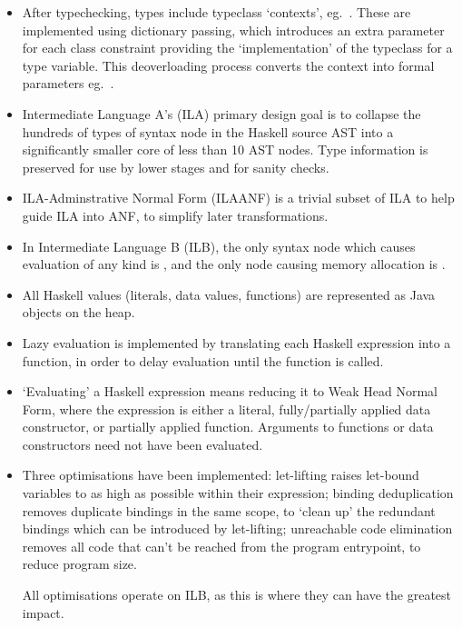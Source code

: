 \documentclass[dissertation.tex]{subfiles}
\begin{document}
{\begin{itemize}
{        Typeclasses provide a way to implement strongly-typed ad-hoc overloading, allowing for the types of overloaded expressions to be known at compile time.
    }
    \item
    {
        After typechecking, types include typeclass `contexts', eg.\ . These are implemented using dictionary passing, which introduces an extra parameter for each class constraint providing the `implementation' of the typeclass for a type variable. This deoverloading process converts the context into formal parameters eg.\ .
    }
    \item
    {
        Intermediate Language A's (ILA) primary design goal is to collapse the hundreds of types of syntax node in the Haskell source AST into a significantly smaller core of less than 10 AST nodes. Type information is preserved for use by lower stages and for sanity checks.
    }
    \item
    {
        ILA-Adminstrative Normal Form (ILAANF) is a trivial subset of ILA to help guide ILA into ANF, to simplify later transformations.
    }
    \item
    {
        In Intermediate Language B (ILB), the only syntax node which causes evaluation of any kind is , and the only node causing memory allocation is .
    }
    \item All Haskell values (literals, data values, functions) are represented as Java objects on the heap.
    \item
    {
        Lazy evaluation is implemented by translating each Haskell expression into a function, in order to delay evaluation until the function is called.
    }
    \item
    {
        `Evaluating' a Haskell expression means reducing it to Weak Head Normal Form, where the expression is either a literal, fully/partially applied data constructor, or partially applied function. Arguments to functions or data constructors need not have been evaluated.
    }
    \item
    {
        Three optimisations have been implemented: let-lifting raises let-bound variables to as high as possible within their expression; binding deduplication removes duplicate bindings in the same scope, to `clean up' the redundant bindings which can be introduced by let-lifting; unreachable code elimination removes all code that can't be reached from the program entrypoint, to reduce program size.

        All optimisations operate on ILB, as this is where they can have the greatest impact.
    }
    \end{itemize}
}
\end{document}
